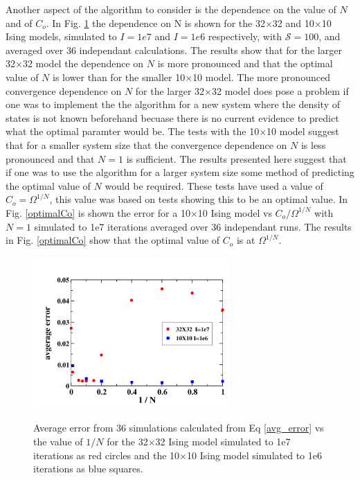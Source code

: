 \documentclass[aps,pre,reprint,superscriptaddress,showkeys]{revtex4-1}
\begin{document}
Another aspect of the algorithm to consider is the dependence on the value of $N$ and of $C_{o}$. In Fig. \ref{N_dependence} the dependence on N is shown for  the 32$\times$32  and  10$\times$10 Ising models, simulated to $I=1e7$ and $I=1e6$ respectively, with $\mathcal{S}=100$, and averaged over 36 independant calculations. The results show that for the larger 32$\times$32 model the dependence on $N$ is more pronounced and that the optimal value of $N$ is lower than for the smaller 10$\times$10 model. The more pronounced convergence dependence on $N$ for the larger 32$\times$32 model does pose a problem if one was to implement the the algorithm for a new system where the density of states is not known beforehand becuase there is no current evidence to predict what the optimal paramter would be.  The tests with the 10$\times$10 model suggest that for a smaller system size that the convergence dependence on $N$ is less pronounced and that $N=1$ is sufficient. The results presented here suggest that if one was to use the algorithm for a larger system size some method of predicting the optimal value of $N$ would be required. These tests have used a value of $C_{o}=\Omega^{1/N}$, this value was based on tests showing this to be an optimal value. In Fig. \ref{optimalCo}   is shown the error for a 10$\times$10 Ising model vs $C_{o}/\Omega^{1/N}$ with $N=1$ simulated to 1e7 iterations averaged over 36 independant runs. The results in Fig. \ref{optimalCo}  show that the optimal value of $C_{o}$ is at $\Omega^{1/N}$. 

\begin{figure}[h!]
\includegraphics[width=7.5cm]{./figures/randN_3232_1010_S100.png}\\
\caption{ Average error from 36 simulations calculated from Eq \ref{avg_error} vs the value of $1/N$ for the 32$\times$32 Ising model simulated to 1e7 iterations as red circles and the 10$\times$10 Ising model simulated to 1e6 iterations as blue squares.    \label{N_dependence}}
\end{figure}
\end{document}
